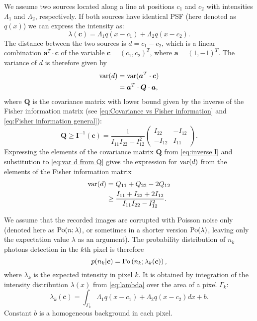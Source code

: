 We assume two sources located along a line at positions $c_1$ and $c_2$ with intensities $\Lambda_1$ and $\Lambda_2$, respectively. If both sources have identical PSF (here denoted as $q(x)$) we can express the intensity as:
%
\begin{equation}
	\lambda(\bm{c})=\Lambda_1q(x-c_1)+\Lambda_2q(x-c_2).
	\label{eq:lambda}
\end{equation}
%
The distance between the two sources is $d=c_1-c_2$, which is a linear combination $\bm{a}^{T}\cdot\bm{c}$ of the variable $\bm{c}=(c_1,c_2)^{T}$, where $\bm{a}=(1,-1)^{T}$. The variance of $d$ is therefore given by 
%
\begin{alignat}{2}
	\mathrm{var}(d)
	&=\mathrm{var}(\bm{a}^{T}\cdot\bm{c})\nonumber\\
	&=\bm{a}^{T}\cdot\bm{Q}\cdot\bm{a},
	\label{eq:var d from Q}
\end{alignat}
%
where $\bm{Q}$ is the covariance matrix with lower bound given by the inverse of the Fisher information matrix (see \autoref{eq:Covariance vs Fisher information} and \autoref{eq:Fisher information general}):
%
\begin{equation}
	\bm{Q}\geq\bm{I}^{-1}(\bm{c})=\frac{1}{I_{11}I_{22}-I_{12}^2}\left(
	\begin{array}{cc}
		I_{22} & -I_{12}\\
		-I_{12} & I_{11}
	\end{array}\right).
	\label{eq:inverse I}
\end{equation}
%
Expressing the elements of the covariance matrix $\bm{Q}$ from \autoref{eq:inverse I} and substitution to \autoref{eq:var d from Q} gives the expression for $\mathrm{var}(d)$ from the elements of the Fisher information matrix
%
\begin{alignat}{2}
	\mathrm{var}(d)
	&=Q_{11}+Q_{22}-2Q_{12}\nonumber\\
	&\geq\frac{I_{11}+I_{22}+2I_{12}}{I_{11}I_{22}-I_{12}^2}.
	\label{eq:variance d alternative}
\end{alignat}

We assume that the recorded images are corrupted with Poisson noise only (denoted here as $\mathrm{Po}(n;\lambda)$, or sometimes in a shorter version $\mathrm{Po}(\lambda)$, leaving only the expectation value $\lambda$ as an argument). The probability distribution of $n_k$ photons detection in the $k$th pixel is therefore
%
\begin{equation}
	p(n_k|\bm{c})=\mathrm{Po}\left(n_k;\lambda_k(\bm{c})\right),
\end{equation}
%
where $\lambda_k$ is the expected intensity in pixel $k$. It is obtained by integration of the intensity distribution $\lambda(x)$ from \autoref{eq:lambda} over the area of a pixel $\Gamma_k$:
%
\begin{equation}
	\lambda_k(\bm{c})=\int_{\Gamma_k}\Lambda_1q(x-c_1)+\Lambda_2q(x-c_2)dx+b.	
	\label{eq:intensity pixel}
\end{equation}
%
Constant $b$ is a homogeneous background in each pixel.

